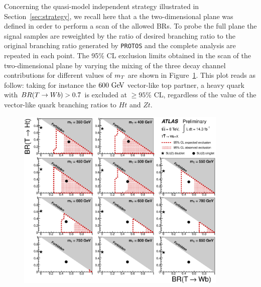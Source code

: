 Concerning the quasi-model independent strategy illustrated in Section~\ref{sec:strategy}, 
we recall here that a the two-dimensional plane was defined in order
to perform a scan of the allowed BRs.
To probe the full plane the signal samples are reweighted by the ratio
of desired branching ratio to the original branching ratio generated
by \texttt{PROTOS} and the complete analysis are repeated in each point.
The  95\% CL exclusion limits  obtained in the scan of the two-dimensional
plane by varying the mixing of the three decay channel contributions for
different values of $m_{\T}$ are shown in Figure~\ref{fig:limits2D_wbx}. 
This plot reads as follow: taking for instance the $600\gev$ 
vector-like top partner, a heavy quark with
$BR(\T\to W b)>0.7$ is excluded at $\geq 95\%$ CL, 
regardless of the value of the vector-like quark branching ratios to $Ht$ and $Zt$.  

\begin{figure}[h!bt]
\begin{center}
\includegraphics[width=0.9\textwidth]{results/figures/NewttbarMod/lim_Scan2D_tight_Bin1.eps}
\caption[bla]{
\label{fig:limits2D_wbx}}
\end{center}
\end{figure}




